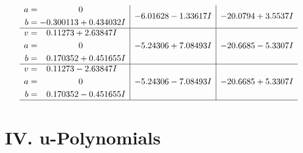 \documentclass[1p]{elsarticle_modified}
\theoremstyle{definition}
\begin{document}
$$\begin{array}{c|c|c}
\begin{aligned}
a &= \phantom{-0.000000 } 0 \\
b &= -0.300113 + 0.434032 I\end{aligned}
 & -6.01628 - 1.33617 I & -20.0794 + 3.5537 I \\ \hline\begin{aligned}
v &= \phantom{-}0.11273 + 2.63847 I \\
a &= \phantom{-0.000000 } 0 \\
b &= \phantom{-}0.170352 + 0.451655 I\end{aligned}
 & -5.24306 + 7.08493 I & -20.6685 - 5.3307 I \\ \hline\begin{aligned}
v &= \phantom{-}0.11273 - 2.63847 I \\
a &= \phantom{-0.000000 } 0 \\
b &= \phantom{-}0.170352 - 0.451655 I\end{aligned}
 & -5.24306 - 7.08493 I & -20.6685 + 5.3307 I\\
 \hline 
 \end{array}$$\newpage
\newpage\renewcommand{\arraystretch}{1}
\centering \section*{ IV. u-Polynomials}
\end{document}
